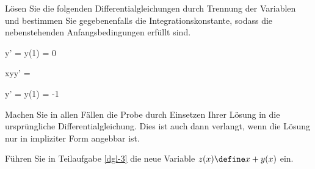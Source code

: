 \begin{atiTask}[
	title = Die Methode der Variablentrennung
]
	Lösen Sie die folgenden Differentialgleichungen durch Trennung der Variablen und bestimmen Sie gegebenenfalls die Integrationskonstante, sodass die nebenstehenden Anfangsbedingungen erfüllt sind.
	\begin{atiSubequations}
		\item{
			\label{dgl-1}
			y' =  \separate y(1) = 0
		}
		\item{
			\label{dgl-2}
			xyy' = 
		}
		\item{
			\label{dgl-3}
			y' =  \separate y(1) = -1
		}
	\end{atiSubequations}
	Machen Sie in allen Fällen die Probe durch Einsetzen Ihrer Lösung in die ursprüngliche Differentialgleichung. Dies ist auch dann verlangt, wenn die Lösung nur in impliziter Form angebbar ist.

	\begin{atiNote}
		Führen Sie in Teilaufgabe \ref{dgl-3} die neue Variable $z(x)\define x + y(x)$ ein.
	\end{atiNote}
\end{atiTask}

